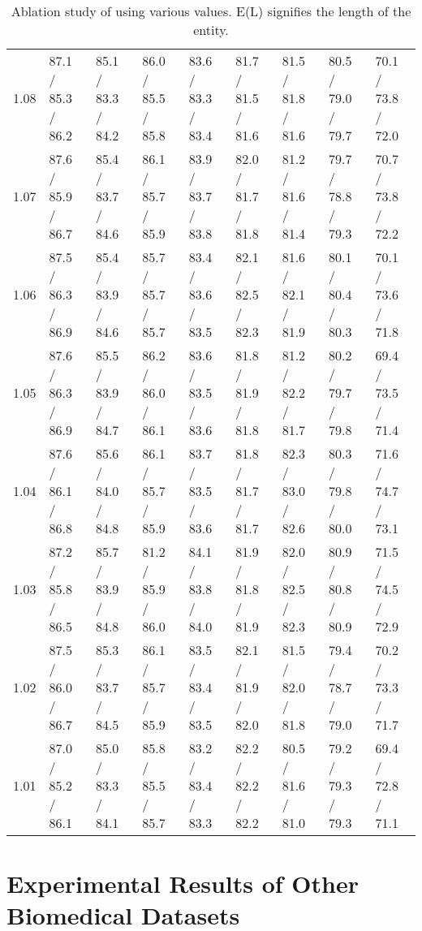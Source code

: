 \documentclass[11pt]{article}
\begin{document}
\begin{table*}[t]
\begin{adjustbox}{width=\textwidth}
\begin{tabular}{ c l l l l l l l l }
1.08 & 87.1 / 85.3 / 86.2 & 85.1 / 83.3 / 84.2 & 86.0 / 85.5 / 85.8 & 83.6 / 83.3 / 83.4 & 81.7 / 81.5 / 81.6 & 81.5 / 81.8 / 81.6 & 80.5 / 79.0 / 79.7 & 70.1 / 73.8 / 72.0 \\ 
1.07 & 87.6 / 85.9 / 86.7 & 85.4 / 83.7 / 84.6 & 86.1 / 85.7 / 85.9 & 83.9 / 83.7 / 83.8 & 82.0 / 81.7 / 81.8 & 81.2 / 81.6 / 81.4 & 79.7 / 78.8 / 79.3 & 70.7 / 73.8 / 72.2 \\ 
1.06                                         & 87.5 / 86.3 / 86.9 & 85.4 / 83.9 / 84.6 & 85.7 / 85.7 / 85.7 & 83.4 / 83.6 / 83.5 & 82.1 / 82.5 / 82.3 & 81.6 / 82.1 / 81.9 & 80.1 / 80.4 / 80.3 & 70.1 / 73.6 / 71.8 \\ 
1.05                                         & 87.6 / 86.3 / 86.9 & 85.5 / 83.9 / 84.7 & 86.2 / 86.0 / 86.1 & 83.6 / 83.5 / 83.6 & 81.8 / 81.9 / 81.8 & 81.2 / 82.2 / 81.7 & 80.2 / 79.7 / 79.8 & 69.4 / 73.5 / 71.4 \\ 
1.04                                         & 87.6 / 86.1 / 86.8 & 85.6 / 84.0 / 84.8 & 86.1 / 85.7 / 85.9 & 83.7 / 83.5 / 83.6 & 81.8 / 81.7 / 81.7 & 82.3 / 83.0 / 82.6 & 80.3 / 79.8 / 80.0 & 71.6 / 74.7 / 73.1 \\ 
1.03                                         & 87.2 / 85.8 / 86.5 & 85.7 / 83.9 / 84.8 & 81.2 / 85.9 / 86.0 & 84.1 / 83.8 / 84.0 & 81.9 / 81.8 / 81.9 & 82.0 / 82.5 / 82.3 & 80.9 / 80.8 / 80.9 & 71.5 / 74.5 / 72.9 \\ 
1.02                                         & 87.5 / 86.0 / 86.7 & 85.3 / 83.7 / 84.5 & 86.1 / 85.7 / 85.9 & 83.5 / 83.4 / 83.5 & 82.1 / 81.9 / 82.0 & 81.5 / 82.0 / 81.8 & 79.4 / 78.7 / 79.0 & 70.2 / 73.3 / 71.7 \\ 
1.01                                         & 87.0 / 85.2 / 86.1 & 85.0 / 83.3 / 84.1 & 85.8 / 85.5 / 85.7 & 83.2 / 83.4 / 83.3 & 82.2 / 82.2 / 82.2 & 80.5 / 81.6 / 81.0 & 79.2 / 79.3 / 79.3 & 69.4 / 72.8 / 71.1 \\ \bottomrule
\end{tabular}
\end{adjustbox}
\caption{Ablation study of using various  values. E(L) signifies the length of the entity.}
\label{tab:app length ablation}
\end{table*}

\section{Experimental Results of Other Biomedical Datasets}
\label{app:experimental results}
\end{document}
